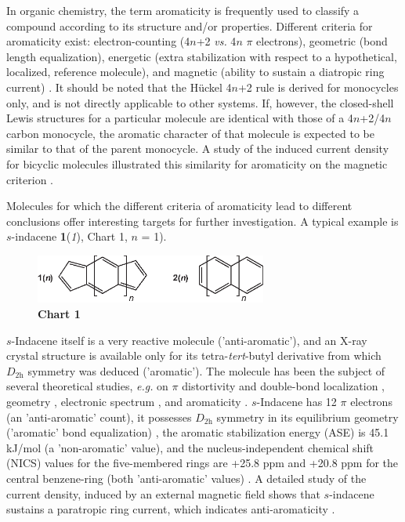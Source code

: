 In organic chemistry, the term aromaticity is frequently used to classify a compound according to its structure and/or properties. Different criteria for aromaticity exist: electron-counting (4$n$+2 \textit{vs.} 4$n$ $\pi$ electrons), geometric (bond length equalization), energetic (extra stabilization with respect to a hypothetical, localized, reference molecule), and magnetic (ability to sustain a diatropic ring current)  \cite{r01,r02,r03,r04}. It should be noted that the H\"uckel 4$n$+2 rule is derived for monocycles only, and is not directly applicable to other systems. If, however, the closed-shell Lewis structures for a particular molecule are identical with those of a 4$n$+2/4$n$ carbon monocycle, the aromatic character of that molecule is expected to be similar to that of the parent monocycle. A study of the induced current density for bicyclic molecules illustrated this similarity for aromaticity on the magnetic criterion  \cite{r05}.

Molecules for which the different criteria of aromaticity lead to different conclusions offer interesting targets for further investigation. A typical example is $s$-indacene \textbf{1}(\textit{1}), Chart 1, $n$ = 1).
\begin{figure}[htdp]
\center
\includegraphics[width=3in]{indacene/figures/chart1.eps}\\
\textbf{Chart 1}
\end{figure}
$s$-Indacene itself is a very reactive molecule  \cite{r06} ('anti-aromatic'), and an \mbox{X-ray} crystal structure is available only for its tetra-\textit{tert}-butyl derivative  \cite{r07} from which $D_\mathrm{2h}$ symmetry was deduced ('aromatic'). The molecule has been the subject of several theoretical studies, \textit{e.g.} on $\pi$ distortivity and double-bond localization  \cite{r08}, geometry  \cite{r09,r10}, electronic spectrum  \cite{r11,r12}, and aromaticity  \cite{r13,r14}. $s$-Indacene has 12 $\pi$ electrons (an 'anti-aromatic' count), it possesses $D_\mathrm{2h}$ symmetry in its equilibrium geometry ('aromatic' bond equalization)  \cite{r10}, the aromatic stabilization energy (ASE) is 45.1 kJ/mol (a 'non-aromatic' value), and the nucleus-independent chemical shift (NICS)  \cite{r15} values for the five-membered rings are +25.8 ppm and +20.8 ppm for the central benzene-ring (both 'anti-aromatic' values)  \cite{r13}. A detailed study of the current density, induced by an external magnetic field shows that $s$-indacene sustains a paratropic ring current, which indicates anti-aromaticity  \cite{r14}.

